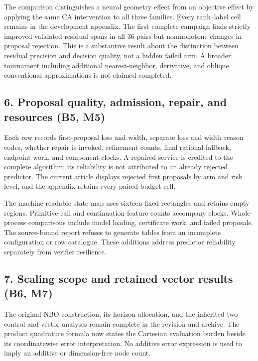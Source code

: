 The comparison distinguishes a neural geometry effect from an objective
effect by applying the same CA intervention to all three families. Every
rank--label cell remains in the development appendix. The first complete
campaign finds strictly improved validated residual spans in all 36
pairs but nonmonotone changes in proposal rejection. This is a
substantive result about the distinction between residual precision and
decision quality, not a hidden failed arm. A broader tournament
including additional nearest-neighbor, derivative, and oblique
conventional approximations is not claimed completed.

\hypertarget{proposal-quality-admission-repair-and-resources-b5-m5}{%
\subsection{6. Proposal quality, admission, repair, and resources (B5,
M5)}\label{proposal-quality-admission-repair-and-resources-b5-m5}}

Each row records first-proposal loss and width, separate loss and width
reason codes, whether repair is invoked, refinement counts, final
rational fallback, endpoint work, and component clocks. A repaired
service is credited to the complete algorithm; its reliability is not
attributed to an already rejected predictor. The current article
displays rejected first proposals by arm and risk level, and the
appendix retains every paired budget cell.

The machine-readable state map uses sixteen fixed rectangles and retains
empty regions. Primitive-call and continuation-feature counts accompany
clocks. Whole-process comparisons include model loading, certificate
work, and failed proposals. The source-bound report refuses to generate
tables from an incomplete configuration or row catalogue. These
additions address predictor reliability separately from verifier
resilience.

\hypertarget{scaling-scope-and-retained-vector-results-b6-m7}{%
\subsection{7. Scaling scope and retained vector results (B6,
M7)}\label{scaling-scope-and-retained-vector-results-b6-m7}}

The original NBO construction, its horizon allocation, and the inherited
two-control and vector analyses remain complete in the revision and
archive. The product quadrature formula now states the Cartesian
evaluation burden beside its coordinatewise error interpretation. No
additive error expression is used to imply an additive or dimension-free
node count.


